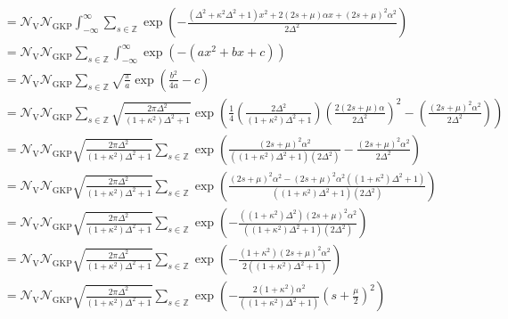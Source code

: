 \documentclass[11pt]{article}
\begin{document}
\begin{align*}
                                     & = \mathcal{N}_{\mathrm{V}} \mathcal{N}_{\mathrm{GKP}} \int_{-\infty}^{\infty} \sum_{s \in \mathbb{Z}} \exp\!\left(-\frac{(\Delta^2 + \kappa^2 \Delta^2 + 1) x^2 + 2(2s+\mu)\alpha x + (2s+\mu)^2 \alpha^2}{2\Delta^2}\right)
    \\
                                     & = \mathcal{N}_{\mathrm{V}} \mathcal{N}_{\mathrm{GKP}} \sum_{s \in \mathbb{Z}} \int_{-\infty}^{\infty} \exp\!\left(-(ax^2 + bx + c)\right)
    \\
                                     & = \mathcal{N}_{\mathrm{V}} \mathcal{N}_{\mathrm{GKP}} \sum_{s \in \mathbb{Z}} \sqrt{\frac{\pi}{a}} \exp\!\left(\frac{b^2}{4a} - c\right)
    \\
                                     & = \mathcal{N}_{\mathrm{V}} \mathcal{N}_{\mathrm{GKP}} \sum_{s \in \mathbb{Z}} \sqrt{\frac{2\pi\Delta^2}{(1 + \kappa^2)\Delta^2 + 1}} \exp\!\left(\frac{1}{4} \left(\frac{2\Delta^2}{(1 + \kappa^2)\Delta^2 + 1}\right) \left(\frac{2(2s + \mu)\alpha}{2\Delta^2}\right)^2 - \left(\frac{(2s + \mu)^2 \alpha^2}{2\Delta^2}\right)\right)
    \\
                                     & = \mathcal{N}_{\mathrm{V}} \mathcal{N}_{\mathrm{GKP}} \sqrt{\frac{2\pi\Delta^2}{(1 + \kappa^2)\Delta^2 + 1}} \sum_{s \in \mathbb{Z}}  \exp\!\left(\frac{(2s + \mu)^2\alpha^2}{((1 + \kappa^2)\Delta^2 + 1)(2\Delta^2)} - \frac{(2s + \mu)^2 \alpha^2}{2\Delta^2}\right)
    \\
                                     & = \mathcal{N}_{\mathrm{V}} \mathcal{N}_{\mathrm{GKP}} \sqrt{\frac{2\pi\Delta^2}{(1 + \kappa^2)\Delta^2 + 1}} \sum_{s \in \mathbb{Z}}  \exp\!\left(\frac{(2s + \mu)^2\alpha^2 - (2s + \mu)^2\alpha^2((1 + \kappa^2)\Delta^2 + 1)}{((1 + \kappa^2)\Delta^2 + 1)(2\Delta^2)}\right)
    \\
                                     & = \mathcal{N}_{\mathrm{V}} \mathcal{N}_{\mathrm{GKP}} \sqrt{\frac{2\pi\Delta^2}{(1 + \kappa^2)\Delta^2 + 1}} \sum_{s \in \mathbb{Z}}  \exp\!\left(-\frac{((1 + \kappa^2)\Delta^2) (2s + \mu)^2\alpha^2}{((1 + \kappa^2)\Delta^2 + 1)(2\Delta^2)}\right)
    \\
                                     & = \mathcal{N}_{\mathrm{V}} \mathcal{N}_{\mathrm{GKP}} \sqrt{\frac{2\pi\Delta^2}{(1 + \kappa^2)\Delta^2 + 1}} \sum_{s \in \mathbb{Z}}  \exp\!\left(-\frac{(1 + \kappa^2) (2s + \mu)^2\alpha^2}{2((1 + \kappa^2)\Delta^2 + 1)}\right)
    \\
                                     & = \mathcal{N}_{\mathrm{V}} \mathcal{N}_{\mathrm{GKP}} \sqrt{\frac{2\pi\Delta^2}{(1 + \kappa^2)\Delta^2 + 1}} \sum_{s \in \mathbb{Z}}  \exp\!\left(-\frac{2(1 + \kappa^2)\alpha^2}{((1 + \kappa^2)\Delta^2 + 1)}\left(s + \frac{\mu}{2}\right)^2\right)

\end{align*}
\end{document}
